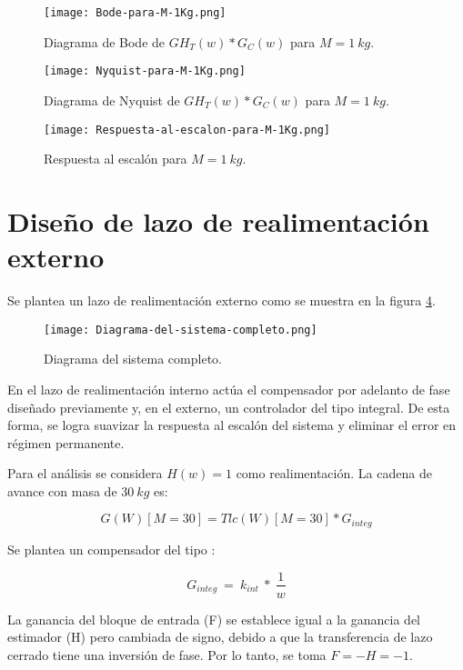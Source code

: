 \begin{figure}[H]
	\centering
	\texttt{[image: Bode-para-M-1Kg.png]}
	\caption{Diagrama de Bode de $GH_T(w)*G_C(w)$ para $M=1\:kg$.}
	\label{fig:bode-para-M-1Kg}
\end{figure}

\begin{figure}[H]
	\centering
	\texttt{[image: Nyquist-para-M-1Kg.png]}
	\caption{Diagrama de Nyquist de $GH_T(w)*G_C(w)$ para $M=1\:kg$.}
	\label{fig:nyquist-para-M-1Kg}
\end{figure}

\begin{figure}[H]
	\centering
	\texttt{[image: Respuesta-al-escalon-para-M-1Kg.png]}
	\caption{Respuesta al escalón para $M=1\:kg$.}
	\label{fig:respuesta-al-escalon-para-M-1Kg}
\end{figure}

\section{Diseño de lazo de realimentación externo}

\noindent Se plantea un lazo de realimentaci\'{o}n externo como se muestra en la  figura \ref{fig:diagrama-del-sistema-completo}.

\begin{figure}[H]
	\centering
	\texttt{[image: Diagrama-del-sistema-completo.png]}
	\caption{Diagrama del sistema completo.}
	\label{fig:diagrama-del-sistema-completo}
\end{figure}


\noindent En el lazo de realimentaci\'{o}n interno act\'{u}a el compensador por adelanto de fase dise\~{n}ado previamente y, en el externo, un controlador del tipo integral. De esta forma, se logra suavizar la respuesta al escal\'{o}n del sistema y eliminar el error en r\'{e}gimen permanente.


\noindent Para el an\'{a}lisis se considera $H(w)=1$ como realimentaci\'{o}n. La cadena de avance con masa de $30\:kg$ es:

\[G(W)[M=30]=Tlc(W)[M=30]*G_{integ}\] 

\noindent Se  plantea un compensador del tipo :

\[G_{integ}\ =\ k_{int}\ *\ \frac{1}{w}\] 

\noindent La ganancia del bloque de entrada (F) se establece igual a la ganancia del estimador (H) pero cambiada de signo, debido a que la transferencia de lazo cerrado tiene una inversi\'{o}n de fase. Por lo tanto, se toma $F=-H=-1$.

